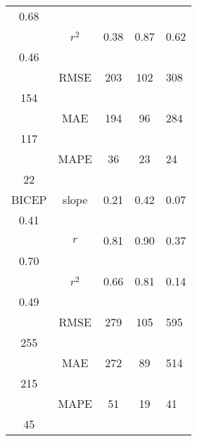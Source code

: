 \begin{table}[h]
\begin{tabular}{cccc}
0.68 \\
& $r^2$ & 0.38 & 0.87 & 0.62 &  \\
0.46 \\
& RMSE & 203 & 102 & 308 &  \\
154 \\
& MAE & 194 & 96 & 284 &  \\
117 \\
& MAPE & 36 & 23 & 24 &  \\
22 \\
\cmidrule(lr){1-6}
BICEP & slope & 0.21 & 0.42 & 0.07 &  \\
0.41 \\
& $r$ & 0.81 & 0.90 & 0.37 &  \\
0.70 \\
& $r^2$ & 0.66 & 0.81 & 0.14 &  \\
0.49 \\
& RMSE & 279 & 105 & 595 &  \\
255 \\
& MAE & 272 & 89 & 514 &  \\
215 \\
& MAPE & 51 & 19 & 41 &  \\
45 \\
\bottomrule
\end{tabular}
\end{table}
